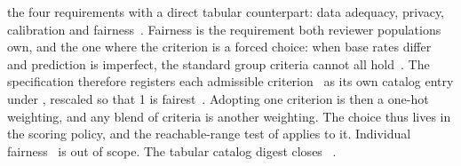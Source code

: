  the four requirements with a direct tabular counterpart: data adequacy, privacy, calibration and fairness~.
Fairness is the requirement both reviewer populations own, and the one where the criterion is a forced choice: when base rates differ and prediction is imperfect, the standard group criteria cannot all hold~\cite{kleinberg2017inherent,chouldechova2017fair}.
The specification therefore registers each admissible criterion~\cite{verma2018fairness} as its own catalog entry under , rescaled so that 1 is fairest~.
Adopting one criterion is then a one-hot weighting, and any blend of criteria is another weighting.
The choice thus lives in the scoring policy, and the reachable-range test of  applies to it.
Individual fairness~\cite{dwork2012fairness} is out of scope.
The tabular catalog digest closes ~.

